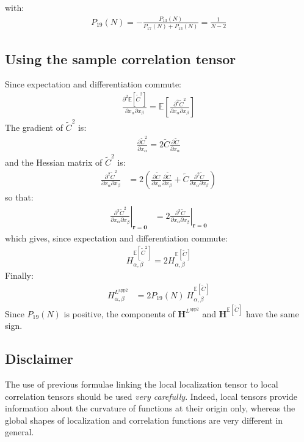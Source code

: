 \documentclass[12pt]{scrartcl}
\begin{document}
with:
\begin{align}
P_{19}(N) = -\frac{P_{13}(N)}{P_{17}(N) + P_{13}(N)} = \frac{1}{N-2}
\end{align}

\subsection{Using the sample correlation tensor}
Since expectation and differentiation commute:
\begin{align}
\frac{\partial^2 \mathbb{E} \left[\widetilde{C}^2\right]}{\partial x_\alpha \partial x_\beta} = \mathbb{E} \left[ \frac{\partial^2 \widetilde{C}^2}{\partial x_\alpha \partial x_\beta} \right]
\end{align}
The gradient of $\widetilde{C}^2$ is:
\begin{align}
\frac{\partial \widetilde{C}^2}{\partial x_\alpha} = 2 \widetilde{C} \frac{\partial \widetilde{C}}{\partial x_\alpha}
\end{align}
and the Hessian matrix of $\widetilde{C}^2$ is:
\begin{align}
\frac{\partial^2 \widetilde{C}^2}{\partial x_\alpha \partial x_\beta} & = 2 \left(\frac{\partial \widetilde{C}}{\partial x_\alpha} \frac{\partial \widetilde{C}}{\partial x_\beta} + \widetilde{C} \frac{\partial^2 \widetilde{C}}{\partial x_\alpha \partial x_\beta} \right)
\end{align}
so that:
\begin{align}
\left.\frac{\partial^2 \widetilde{C}^2}{\partial x_\alpha \partial x_\beta} \right|_{\mathbf{r}=\mathbf{0}} & = 2 \left.\frac{\partial^2 \widetilde{C}}{\partial x_\alpha \partial x_\beta} \right|_{\mathbf{r}=\mathbf{0}}
\end{align}
which gives, since expectation and differentiation commute:
\begin{align}
H^{\mathbb{E} \left[ \widetilde{C}^2 \right]}_{\alpha,\beta} = 2 H^{\mathbb{E} \left[ \widetilde{C} \right]}_{\alpha,\beta}
\end{align}
Finally:
\begin{align}
H^{L^\mathrm{app2}}_{\alpha,\beta} & = 2 P_{19}(N) \ H^{\mathbb{E} \left[ \widetilde{C} \right]}_{\alpha,\beta}
\end{align}
Since $P_{19}(N)$ is positive, the components of $\mathbf{H}^{L^\mathrm{app2}}$ and $\mathbf{H}^{\mathbb{E} \left[ \widetilde{C} \right]}$ have the same sign.

\subsection{Disclaimer}
The use of previous formulae linking the local localization tensor to local correlation tensors should be used \textit{very carefully}. Indeed, local tensors provide information about the curvature of functions at their origin only, whereas the global shapes of localization and correlation functions are very different in general.
\end{document}
